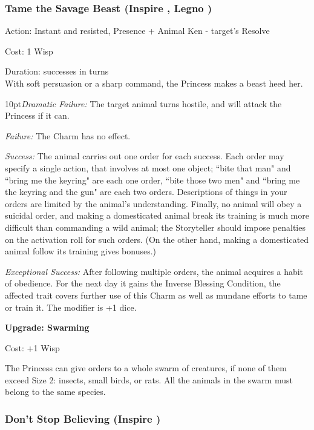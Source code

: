 \subsubsection*{Tame the Savage Beast (Inspire \textbullet\textbullet\textbullet, Legno \textbullet\textbullet)}

\noindent Action: Instant and resisted, Presence + Animal Ken - target's Resolve

\noindent Cost: 1 Wisp

\noindent Duration: successes in turns \\

\noindent With soft persuasion or a sharp command, the Princess makes a beast heed her.

    \begin{myindentpar}{10pt}\emph{Dramatic Failure:} The target animal turns hostile, and will attack the Princess if it can.

    \emph{Failure:} The Charm has no effect.

    \emph{Success:} The animal carries out one order for each success. Each order may specify a single action, that involves at most one object; \textquotedblleft bite that man" and \textquotedblleft bring me the keyring" are each one order, \textquotedblleft bite those two men" and \textquotedblleft bring me the keyring and the gun" are each two orders. Descriptions of things in your orders are limited by the animal's understanding. Finally, no animal will obey a suicidal order, and making a domesticated animal break its training is much more difficult than commanding a wild animal; the Storyteller should impose penalties on the activation roll for such orders. (On the other hand, making a domesticated animal follow its training gives bonuses.)

    \emph{Exceptional Success:} After following multiple orders, the animal acquires a habit of obedience. For the next day it gains the Inverse Blessing Condition, the affected trait covers further use of this Charm as well as mundane efforts to tame or train it. The modifier is +1 dice.

\textbf{Upgrade: Swarming}

\noindent Cost: +1 Wisp

The Princess can give orders to a whole swarm of creatures, if none of them exceed Size 2: insects, small birds, or rats. All the animals in the swarm must belong to the same species.\end{myindentpar}

\subsubsection*{Don't Stop Believing (Inspire \textbullet\textbullet\textbullet\textbullet)}

